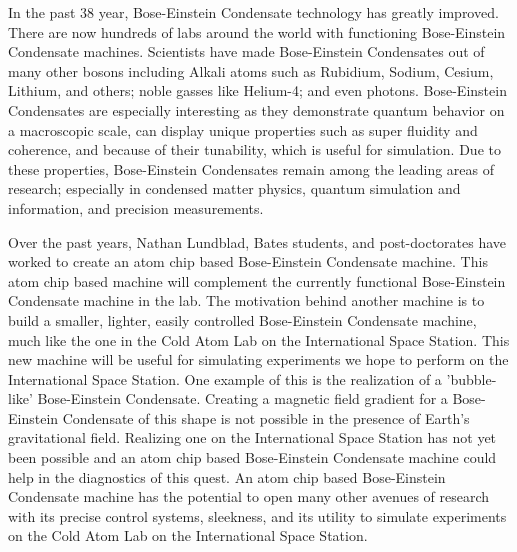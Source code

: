 In the past 38 year, Bose-Einstein Condensate technology has greatly improved. There are now hundreds of labs around the world with functioning Bose-Einstein Condensate machines. Scientists have made Bose-Einstein Condensates out of many other bosons including Alkali atoms such as Rubidium, Sodium, Cesium, Lithium, and others; noble gasses like Helium-4; and even photons. Bose-Einstein Condensates are especially interesting as they demonstrate quantum behavior on a macroscopic scale, can display unique properties such as super fluidity and coherence, and because of their tunability, which is useful for simulation. Due to these properties, Bose-Einstein Condensates remain among the leading areas of research; especially in condensed matter physics, quantum simulation and information, and precision measurements. 


Over the past years, Nathan Lundblad, Bates students, and post-doctorates have worked to create an atom chip based Bose-Einstein Condensate machine. This atom chip based machine will complement the currently functional Bose-Einstein Condensate machine in the lab. The motivation behind another machine is to build a smaller, lighter, easily controlled Bose-Einstein Condensate machine, much like the one in the Cold Atom Lab on the International Space Station. This new machine will be useful for simulating experiments we hope to perform on the International Space Station. One example of this is the realization of a 'bubble-like' Bose-Einstein Condensate. Creating a magnetic field gradient for a Bose-Einstein Condensate of this shape is not possible in the presence of Earth's gravitational field. Realizing one on the International Space Station has not yet been possible and an atom chip based Bose-Einstein Condensate machine could help in the diagnostics of this quest. An atom chip based Bose-Einstein Condensate machine has the potential to open many other avenues of research with its precise control systems, sleekness, and its utility to simulate experiments on the Cold Atom Lab on the International Space Station. 


